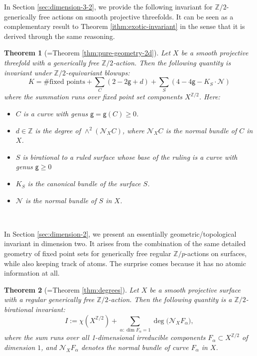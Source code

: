 \documentclass[12pt,a4paper]{amsart}
\newtheorem{Mtheorem}{Theorem}
\theoremstyle{definition}
\theoremstyle{remark}
\begin{document}
In Section \ref{sec:dimension-3-2}, we provide the following invariant for $\mathbb Z/2$-generically free actions on smooth projective threefolds. It can be seen as a complementary result to Theorem \ref{ithm:exotic-invariant} in the sense that it is derived through the same reasoning.

\begin{Mtheorem}[=Theorem \ref{thm:pure-geometry-2d}]
       Let $X$ be a smooth projective threefold with a generically free $\mathbb Z/2$‐action.  Then the following quantity is invariant under \(\mathbb{Z}/2\)-equivariant blowups:
\begin{equation}
  K = 
    \#\text{fixed points}
    + 
    \sum_{C} \left(2 - 2\mathsf{g} + d\right)
    +
    \sum_{S} \left(4 - 4\mathsf{g} - K_S\cdot \mathcal N\right)
\end{equation}
where the summation runs over fixed point set components $X^{\mathbb Z/2}$. Here:
\begin{itemize}
  \item 
   $C$ is a curve with genus \(\mathsf{g}=\mathsf{g}(C) \geq 0\).
  \item 
    \(d \in \mathbb{Z}\) is the degree of \(\wedge^{2}(\mathcal{N}_XC)\), where \(\mathcal{N}_XC\) is the normal bundle of $C$ in $X$.
  \item $S$ is birational to a ruled surface whose base of the ruling is a curve with genus 
    \(\mathsf{g} \geq 0\) 
  \item 
    \(K_{S}\) is the canonical bundle of the surface \(S\).
  \item 
    \(\mathcal{N}\) is the normal bundle of \(S\) in $X$.
\end{itemize}
\end{Mtheorem}

\ 

In Section \ref{sec:dimension-2}, we present an essentially geometric/topological invariant in dimension two. It arises from the combination of the same detailed geometry of fixed point sets for generically free regular $\mathbb Z/p$-actions on surfaces, while also keeping track of atoms. The surprise comes because it has no atomic information at all. 


\begin{Mtheorem}[=Theorem \ref{thm:degrees}]
Let \( X \) be a smooth projective surface with a regular generically free \( \mathbb{Z}/2 \)-action. Then the following quantity is a \( \mathbb{Z}/2 \)-birational invariant:
\[
I:=\chi(X^{\mathbb{Z}/2}) + \sum_{\alpha:\dim F_\alpha=1} \deg\big( \mathcal{N}_X F_\alpha \big),
\]
where the sum runs over all 1-dimensional irreducible components \( F_\alpha \subset X^{\mathbb{Z}/2} \) of dimension $1$, and \( \mathcal{N}_X F_\alpha \) denotes the normal bundle of curve \( F_\alpha \) in \( X \).
\end{Mtheorem}
\end{document}
